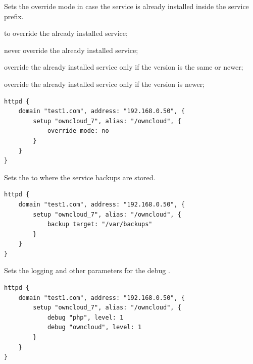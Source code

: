 Sets the override mode in case the service is already installed inside
the service prefix.
\begin{asparaitem}
\item {} to override the already installed service;
\item {} never override the already installed service;
\item {} override the already installed service only if the version is the same or newer;
\item {} override the already installed service only if the version is newer;
\end{asparaitem}

\begin{lstlisting}[style=Java]
httpd {
    domain "test1.com", address: "192.168.0.50", {
        setup "owncloud_7", alias: "/owncloud", {
            override mode: no
        }
    }
}
\end{lstlisting}


Sets the  to where the service backups are stored.

\begin{lstlisting}[style=Java]
httpd {
    domain "test1.com", address: "192.168.0.50", {
        setup "owncloud_7", alias: "/owncloud", {
            backup target: "/var/backups"
        }
    }
}
\end{lstlisting}


Sets the logging  and other parameters for the debug .

\begin{lstlisting}[style=Java]
httpd {
    domain "test1.com", address: "192.168.0.50", {
        setup "owncloud_7", alias: "/owncloud", {
            debug "php", level: 1
            debug "owncloud", level: 1
        }
    }
}
\end{lstlisting}

 \\

